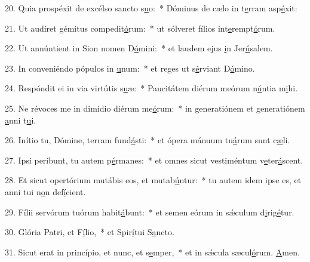 20. Quia prospéxit de excélso sancto s\uline{u}o:~* Dóminus de cælo in t\uline{e}rram asp\uline{é}xit:\par 
21. Ut audíret gémitus compedit\uline{ó}rum:~* ut sólveret fílios int\uline{e}rempt\uline{ó}rum.\par 
22. Ut annúntient in Sion nomen D\uline{ó}mini:~* et laudem ejus \uline{i}n Jer\uline{ú}salem.\par 
23. In conveniéndo pópulos in \uline{u}num:~* et reges ut s\uline{é}rviant D\uline{ó}mino.\par 
24. Respóndit ei in via virtútis s\uline{u}æ:~* Paucitátem diérum meórum n\uline{ú}ntia m\uline{i}hi.\par 
25. Ne révoces me in dimídio diérum me\uline{ó}rum:~* in generatiónem et generatiónem \uline{a}nni t\uline{u}i.\par 
26. Inítio tu, Dómine, terram fund\uline{á}sti:~* et ópera mánuum tu\uline{á}rum sunt c\uline{æ}li.\par 
27. Ipsi períbunt, tu autem p\uline{é}rmanes:~* et omnes sicut vestiméntum v\uline{e}ter\uline{á}scent.\par 
28. Et sicut opertórium mutábis eos, et mutab\uline{ú}ntur:~* tu autem idem ipse es, et anni tui n\uline{o}n def\uline{í}cient.\par 
29. Fílii servórum tuórum habit\uline{á}bunt:~* et semen eórum in sǽculum d\uline{i}rig\uline{é}tur.\par 
30. Glória Patri, et F\uline{í}lio,~* et Spir\uline{í}tui S\uline{a}ncto.\par 
31. Sicut erat in princípio, et nunc, et s\uline{e}mper,~* et in sǽcula sæcul\uline{ó}rum. \uline{A}men.\par 
